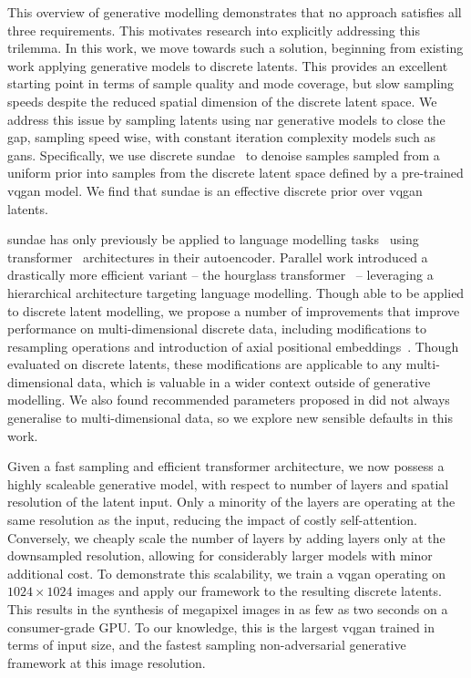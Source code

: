 This overview of generative modelling demonstrates that no approach satisfies
all three requirements. This motivates research into explicitly addressing this
trilemma. In this work, we move towards such a solution, beginning from existing
work applying generative models to discrete latents. This provides an excellent
starting point in terms of sample quality and mode coverage, but slow sampling
speeds despite the reduced spatial dimension of the discrete latent space. We
address this issue by sampling latents using \gls{nar} generative models to
close the gap, sampling speed wise, with constant iteration complexity models
such as \glspl{gan}. Specifically, we use discrete
\gls{sundae}~\cite{savinov2022stepunrolled} to denoise samples sampled from a
uniform prior into samples from the discrete latent space defined by a
pre-trained \gls{vqgan} model. We find that \gls{sundae} is an effective
discrete prior over \gls{vqgan} latents.

\Gls{sundae} has only previously be applied to language modelling
tasks~\cite{savinov2022stepunrolled} using
transformer~\cite{vaswani2017attention} architectures in their autoencoder.
Parallel work introduced a drastically more efficient variant -- the hourglass
transformer~\cite{nawrot2021hierarchical} -- leveraging a hierarchical
architecture targeting language modelling. Though able to be applied to discrete
latent modelling, we propose a number of improvements that improve performance on
multi-dimensional discrete data, including modifications to resampling
operations and introduction of axial positional
embeddings~\cite{su2021roformer}. Though evaluated on discrete latents, these
modifications are applicable to any multi-dimensional data,
which is valuable in a wider context outside of generative modelling. We
also found recommended parameters proposed in \citet{savinov2022stepunrolled}
did not always generalise to multi-dimensional data, so we explore new sensible
defaults in this work.

Given a fast sampling and efficient transformer architecture, we now possess a
highly scaleable generative model, with respect to number of layers and spatial
resolution of the latent input. Only a minority of the layers are operating at
the same resolution as the input, reducing the impact of costly self-attention.
Conversely, we cheaply scale the number of layers by adding layers only at the
downsampled resolution, allowing for considerably larger models with minor
additional cost. To demonstrate this scalability, we train a \gls{vqgan}
operating on $1024 \times 1024$ images and apply our framework to the resulting
discrete latents. This results in the synthesis of megapixel
images in as few as two seconds on a consumer-grade GPU. To our knowledge, this is
the largest \gls{vqgan} trained in terms of input size, and the fastest
sampling non-adversarial generative framework at this image resolution.

